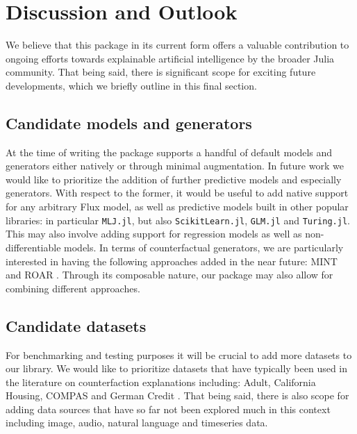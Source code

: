 \documentclass[
  letterpaper,
  DIV=11,
  numbers=noendperiod]{scrartcl}
\begin{document}
\hypertarget{sec-outlook}{%
\section{Discussion and Outlook}\label{sec-outlook}}

We believe that this package in its current form offers a valuable
contribution to ongoing efforts towards explainable artificial
intelligence by the broader Julia community. That being said, there is
significant scope for exciting future developments, which we briefly
outline in this final section.

\hypertarget{candidate-models-and-generators}{%
\subsection{Candidate models and
generators}\label{candidate-models-and-generators}}

At the time of writing the package supports a handful of default models
and generators either natively or through minimal augmentation. In
future work we would like to prioritize the addition of further
predictive models and especially generators. With respect to the former,
it would be useful to add native support for any arbitrary Flux model,
as well as predictive models built in other popular libraries: in
particular \texttt{MLJ.jl}, but also \texttt{ScikitLearn.jl},
\texttt{GLM.jl} and \texttt{Turing.jl}. This may also involve adding
support for regression models as well as non-differentiable models. In
terms of counterfactual generators, we are particularly interested in
having the following approaches added in the near future: MINT
\cite{karimi2021algorithmic} and ROAR \cite{upadhyay2021robust}. Through
its composable nature, our package may also allow for combining
different approaches.

\hypertarget{candidate-datasets}{%
\subsection{Candidate datasets}\label{candidate-datasets}}

For benchmarking and testing purposes it will be crucial to add more
datasets to our library. We would like to prioritize datasets that have
typically been used in the literature on counterfaction explanations
including: Adult, California Housing, COMPAS and German Credit
\cite{karimi2020survey}. That being said, there is also scope for adding
data sources that have so far not been explored much in this context
including image, audio, natural language and timeseries data.
\end{document}
